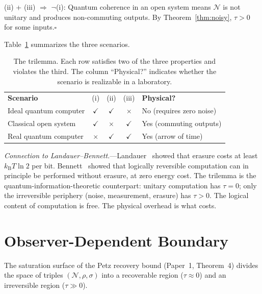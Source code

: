 \documentclass[prl,twocolumn,superscriptaddress,longbibliography,floatfix]{revtex4-2}
\newcommand{\kB}{k_{\mathrm{B}}}
\newcommand{\chan}{\mathcal{N}}
\newcommand{\tauasym}{\tau}
\begin{document}
(ii) + (iii) $\Rightarrow$ $\lnot$(i):
Quantum coherence in an open system means $\chan$ is not unitary
and produces non-commuting outputs.  By Theorem~\ref{thm:noisy},
$\tauasym > 0$ for some inputs.\hfill$\square$

Table~\ref{tab:trilemma} summarizes the three scenarios.

\begin{table}[htbp]
\caption{\label{tab:trilemma}The trilemma.  Each row satisfies two of
the three properties and violates the third.  The column ``Physical?''
indicates whether the scenario is realizable in a laboratory.}
\begin{ruledtabular}
\begin{tabular}{lcccl}
\textbf{Scenario} & (i) & (ii) & (iii) & \textbf{Physical?} \\
\colrule
Ideal quantum computer &
  $\checkmark$ & $\checkmark$ & $\times$ &
  No (requires zero noise) \\
Classical open system &
  $\checkmark$ & $\times$ & $\checkmark$ &
  Yes (commuting outputs) \\
Real quantum computer &
  $\times$ & $\checkmark$ & $\checkmark$ &
  Yes (arrow of time) \\
\end{tabular}
\end{ruledtabular}
\end{table}

\emph{Connection to Landauer--Bennett.}---Landauer~\cite{Landauer1961}
showed that erasure costs at least $\kB T \ln 2$ per bit.
Bennett~\cite{Bennett1973} showed that logically reversible
computation can in principle be performed without erasure, at zero
energy cost.  The trilemma is the quantum-information-theoretic
counterpart: unitary computation has $\tauasym = 0$; only the
irreversible periphery (noise, measurement, erasure) has
$\tauasym > 0$.  The logical content of computation is free.  The
physical overhead is what costs.

\section{Observer-Dependent Boundary}
\label{sec:observer}

The saturation surface of the Petz recovery bound (Paper~1,
Theorem~4) divides the space of triples $(\chan, \rho, \sigma)$
into a recoverable region ($\tauasym \approx 0$) and an irreversible
region ($\tauasym \gg 0$).
\end{document}

